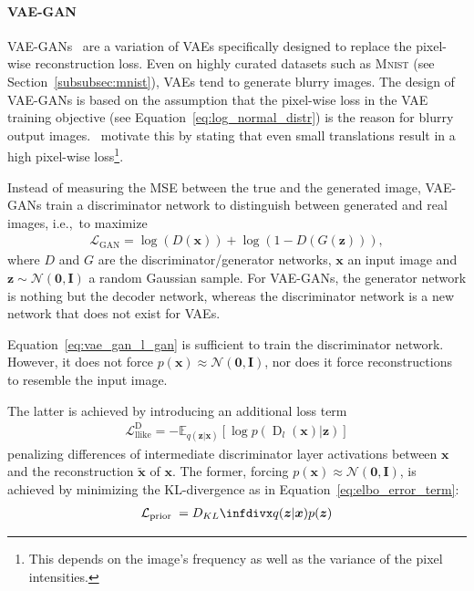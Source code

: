 \paragraph{\ac{VAE}-\ac{GAN}}
\ac{VAE}-\acp{GAN}~\citep{larsen2015autoencoding} are a variation of \acp{VAE} specifically designed to replace the pixel-wise reconstruction loss.
Even on highly curated datasets such as \textsc{Mnist} (see Section~\ref{subsubsec:mnist}), \acp{VAE} tend to generate blurry images.
The design of \ac{VAE}-\acp{GAN} is based on the assumption that the pixel-wise loss in the \ac{VAE} training objective (see Equation~\ref{eq:log_normal_distr}) is the reason for blurry output images.
\citet{larsen2015autoencoding}~motivate this by stating that even small translations result in a high pixel-wise loss\footnote{This depends on the image's frequency as well as the variance of the pixel intensities.}.

Instead of measuring the \ac{MSE} between the true and the generated image, \ac{VAE}-\acp{GAN} train a discriminator network to distinguish between generated and real images, i.e.,~to maximize
\begin{align}
    \mathcal{L}_{\mathrm{GAN}}=\log (D(\bm{x}))+\log (1-D(G(\bm{z}))), \label{eq:vae_gan_l_gan}
\end{align}
where $D$ and $G$ are the discriminator/generator networks, $\bm{x}$ an input image and $\bm{z}\sim \mathcal{N}(\bm{0},\bm{I})$ a random Gaussian sample.
For \ac{VAE}-\acp{GAN}, the generator network is nothing but the decoder network, whereas the discriminator network is a new network that does not exist for \acp{VAE}.

Equation~\ref{eq:vae_gan_l_gan} is sufficient to train the discriminator network.
However, it does not force $p(\bm{x}) \approx \mathcal{N}(\bm{0},\bm{I})$, nor does it force reconstructions to resemble the input image.

The latter is achieved by introducing an additional loss term
\begin{align}
    \mathcal{L}_{\text {llike}}^{\text {D}}=-\mathbb{E}_{q(\bm{z} | \bm{x})}\left[\log p\left(\operatorname{D}_{l}(\bm{x}) | \bm{z}\right)\right]
\end{align}
penalizing differences of intermediate discriminator layer activations between $\bm{x}$ and the reconstruction $\tilde{\bm{x}}$ of $\bm{x}$.
The former, forcing $p(\bm{x}) \approx \mathcal{N}(\bm{0},\bm{I})$, is achieved by minimizing the \ac{KL}-divergence as in Equation~\ref{eq:elbo_error_term}:
\begin{align}
    \mathcal{L}_{\text {prior }}=\kldiv{q(\boldsymbol{z} | \boldsymbol{x})}{p(\boldsymbol{z})}
\end{align}


